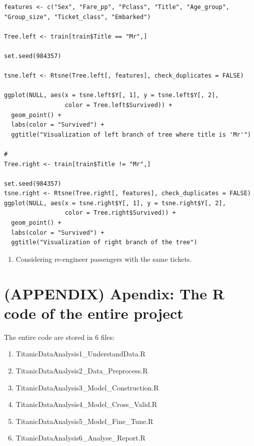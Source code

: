 \documentclass[
]{book}
\providecommand{\tightlist}{%
  \setlength{\itemsep}{0pt}\setlength{\parskip}{0pt}}
\begin{document}
\begin{verbatim}
features <- c("Sex", "Fare_pp", "Pclass", "Title", "Age_group", "Group_size", "Ticket_class", "Embarked")

Tree.left <- train[train$Title == "Mr",]

set.seed(984357)

tsne.left <- Rtsne(Tree.left[, features], check_duplicates = FALSE)

ggplot(NULL, aes(x = tsne.left$Y[, 1], y = tsne.left$Y[, 2],
                 color = Tree.left$Survived)) +
  geom_point() +
  labs(color = "Survived") +
  ggtitle("Visualization of left branch of tree where title is 'Mr'")

#
Tree.right <- train[train$Title != "Mr",]

set.seed(984357)
tsne.right <- Rtsne(Tree.right[, features], check_duplicates = FALSE)
ggplot(NULL, aes(x = tsne.right$Y[, 1], y = tsne.right$Y[, 2],
                 color = Tree.right$Survived)) +
  geom_point() +
  labs(color = "Survived") +
  ggtitle("Visualization of right branch of the tree")
\end{verbatim}

\begin{enumerate}
\def\labelenumi{\arabic{enumi}.}
\setcounter{enumi}{1}
\tightlist
\item
  Considering re-engineer passengers with the same tickets.
\end{enumerate}

\hypertarget{appendix-apendix-the-r-code-of-the-entire-project}{%
\chapter{(APPENDIX) Apendix: The R code of the entire project}\label{appendix-apendix-the-r-code-of-the-entire-project}}

The entire code are stored in 6 files:

\begin{enumerate}
\def\labelenumi{\arabic{enumi}.}
\tightlist
\item
  TitanicDataAnalysis1\_UnderstandData.R
\item
  TitanicDataAnalysis2\_Data\_Preprocess.R
\item
  TitanicDataAnalysis3\_Model\_Construction.R
\item
  TitanicDataAnalysis4\_Model\_Cross\_Valid.R
\item
  TitanicDataAnalysis5\_Model\_Fine\_Tune.R
\item
  TitanicDataAnalysis6\_Analyse\_Report.R
\end{enumerate}
\end{document}
